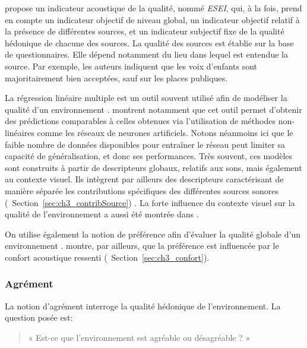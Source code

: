 \citep{garcia2012validation} propose un indicateur acoustique de la qualité, nommé \emph{ESEI}, qui, à la fois, prend en compte un indicateur objectif de niveau global, un indicateur objectif relatif à la présence de différentes sources, et un indicateur subjectif fixe de la qualité hédonique de chacune des sources. La qualité des sources est établie sur la base de questionnaires. Elle dépend notamment du lieu dans lequel est entendue la source. Par exemple, les auteurs indiquent que les voix d'enfants sont majoritairement bien acceptées, sauf sur les places publiques.

La régression linéaire multiple est un outil souvent utilisé afin de modéliser la qualité d'un environnement \citep{ricciardi2015sound}. \citep{brocolini2012prediction} montrent notamment que cet outil permet d'obtenir des prédictions comparables à celles obtenues via l'utilisation de méthodes non-linéaires comme les réseaux de neurones artificiels. Notons néanmoins ici que le faible nombre de données disponibles pour entraîner le réseau peut limiter sa capacité de généralisation, et donc ses performances. Très souvent, ces modèles sont construits à partir de descripteurs globaux, relatifs aux sons, mais également au contexte visuel. Ils intègrent par ailleurs des descripteurs caractérisant de manière séparée les contributions spécifiques des différentes sources sonores (\cf~Section~\ref{sec:ch3_contribSource}) \citep{ricciardi2015sound,brocolini2012prediction}. La forte influence du contexte visuel sur la qualité de l'environnement a aussi été montrée dans \citep{hong2013designing}.

On utilise également la notion de préférence afin d'évaluer la qualité globale d'un environnement \citep{yu2010factors}. \citep{hong2013designing} montre, par ailleurs, que la préférence est influencée par le confort acoustique ressenti (\cf~Section~\ref{sec:ch3_confort}).\\



\subsubsection{Agrément}

La notion d'agrément interroge la qualité hédonique de l'environnement. La question posée est:

\begin{quote}
« Est-ce que l'environnement est agréable ou désagréable ? »
\end{quote}
 
